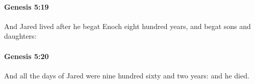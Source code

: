 		\paragraph{Genesis 5:19} %
			\label{GENESIS-5-19}

			And Jared lived after he begat Enoch eight hundred years, and begat sons and daughters:


		\paragraph{Genesis 5:20} %
			\label{GENESIS-5-20}

			And all the days of Jared were nine hundred sixty and two years: and he died.


